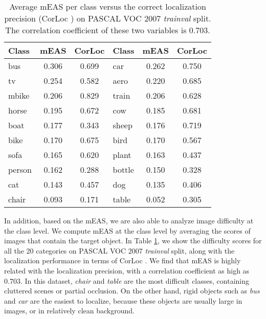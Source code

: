 \documentclass[10pt,twocolumn,letterpaper]{article}
\begin{document}
\begin{table}[t]
\caption{Average mEAS per class versus the correct localization precision (CorLoc \cite{deselaers2012weakly}) on PASCAL VOC 2007 \emph{trainval} split. The correlation coefficient of these two variables is $0.703$. } \label{meas_loc}
\vspace{0.1cm}
\footnotesize
\setlength\tabcolsep{8.2pt}
\begin{tabular}{|l|c|c||l|c|c|}
\hline
Class  &mEAS &CorLoc  &Class&mEAS &CorLoc    \\ \hline
bus   &0.306&0.699&car   &0.262&0.750 \\ \hline
tv    &0.254&0.582&aero  &0.220&0.685 \\ \hline
mbike &0.206&0.829&train &0.206&0.628 \\ \hline
horse &0.195&0.672&cow   &0.185&0.681 \\ \hline
boat  &0.177&0.343&sheep &0.176&0.719 \\ \hline
bike  &0.170&0.675&bird  &0.170&0.567 \\ \hline
sofa  &0.165&0.620&plant &0.163&0.437 \\ \hline
person&0.162&0.288&bottle&0.150&0.328 \\ \hline
cat   &0.143&0.457&dog   &0.135&0.406 \\ \hline
chair &0.093&0.171&table &0.052&0.305 \\ \hline
\end{tabular}
\vspace{-0.1cm}
\end{table}


In addition, based on the mEAS, we are also able to analyze image difficulty at the class level. We compute mEAS at the class level by averaging the scores of images that contain the target object. In Table \ref{meas_loc}, we show the difficulty scores for all the 20 categories on PASCAL VOC 2007 \emph{trainval} split, along with the localization performance \cite{Bilen_2016_CVPR} in terms of CorLoc \cite{deselaers2012weakly}. We find that mEAS is highly related with the localization precision, with a correlation coefficient as high as $0.703$. In this dataset,  \textit{chair} and \textit{table} are the most difficult classes, containing cluttered scenes or partial occlusion. On the other hand, rigid objects such as \textit{bus} and \textit{car} are the easiest to localize, because these objects are usually large in images, or in relatively clean background.
\end{document}
